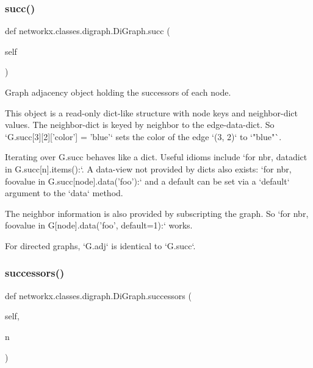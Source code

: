 \subsubsection{\texorpdfstring{succ()}{succ()}}
{\footnotesize\ttfamily def networkx.\+classes.\+digraph.\+Di\+Graph.\+succ (\begin{DoxyParamCaption}\item[{}]{self }\end{DoxyParamCaption})}

\begin{DoxyVerb}Graph adjacency object holding the successors of each node.

This object is a read-only dict-like structure with node keys
and neighbor-dict values.  The neighbor-dict is keyed by neighbor
to the edge-data-dict.  So `G.succ[3][2]['color'] = 'blue'` sets
the color of the edge `(3, 2)` to `"blue"`.

Iterating over G.succ behaves like a dict. Useful idioms include
`for nbr, datadict in G.succ[n].items():`.  A data-view not provided
by dicts also exists: `for nbr, foovalue in G.succ[node].data('foo'):`
and a default can be set via a `default` argument to the `data` method.

The neighbor information is also provided by subscripting the graph.
So `for nbr, foovalue in G[node].data('foo', default=1):` works.

For directed graphs, `G.adj` is identical to `G.succ`.
\end{DoxyVerb}
 \mbox{\label{classnetworkx_1_1classes_1_1digraph_1_1DiGraph_aa39a32232c9918536e5238f5ad1b481c}} 
\subsubsection{\texorpdfstring{successors()}{successors()}}
{\footnotesize\ttfamily def networkx.\+classes.\+digraph.\+Di\+Graph.\+successors (\begin{DoxyParamCaption}\item[{}]{self,  }\item[{}]{n }\end{DoxyParamCaption})}


